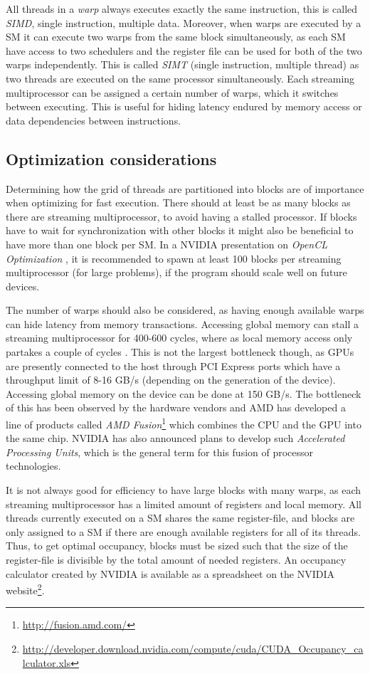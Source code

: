 All threads in a \textit{warp} always executes exactly the same
instruction, this is called \textit{SIMD}, single instruction,
multiple data. Moreover, when warps are executed by a SM it can
execute two warps from the same block simultaneously, as each SM have
access to two schedulers and the register file can be used for both of
the two warps independently. This is called \textit{SIMT} (single
instruction, multiple thread) as two threads are executed on the same
processor simultaneously. Each streaming multiprocessor can be
assigned a certain number of warps, which it switches between
executing. This is useful for hiding latency endured by memory access
or data dependencies between instructions.

\subsection{Optimization considerations}
Determining how the grid of threads are partitioned into blocks are of
importance when optimizing for fast execution. There should at least
be as many blocks as there are streaming multiprocessor, to avoid
having a stalled processor. If blocks have to wait for synchronization
with other blocks it might also be beneficial to have more than one
block per SM. In a NVIDIA presentation on \textit{OpenCL Optimization}
\cite{nvidia2009opencloptimization}, it is recommended to spawn at
least 100 blocks per streaming multiprocessor (for large problems), if
the program should scale well on future devices.

The number of warps should also be considered, as having enough
available warps can hide latency from memory transactions. Accessing
global memory can stall a streaming multiprocessor for 400-600 cycles,
where as local memory access only partakes a couple of cycles
\cite{nvidia2009opencloptimization}. This is not the largest
bottleneck though, as GPUs are presently connected to the host through
PCI Express ports which have a throughput limit of 8-16 GB/s
(depending on the generation of the device). Accessing global memory
on the device can be done at 150 GB/s. The bottleneck of this has been
observed by the hardware vendors and AMD has developed a line of
products called \textit{AMD
  Fusion}\footnote{\url{http://fusion.amd.com/}} which combines the
CPU and the GPU into the same chip. NVIDIA has also announced plans to
develop such \textit{Accelerated Processing Units}, which is the
general term for this fusion of processor technologies.

It is not always good for efficiency to have large blocks with many
warps, as each streaming multiprocessor has a limited amount of
registers and local memory. All threads currently executed on a SM
shares the same register-file, and blocks are only assigned to a SM if
there are enough available registers for all of its threads. Thus, to
get optimal occupancy, blocks must be sized such that the size of the
register-file is divisible by the total amount of needed registers. An
occupancy calculator created by NVIDIA is available as a spreadsheet
on the NVIDIA
website\footnote{\url{http://developer.download.nvidia.com/compute/cuda/CUDA_Occupancy_calculator.xls}}.

